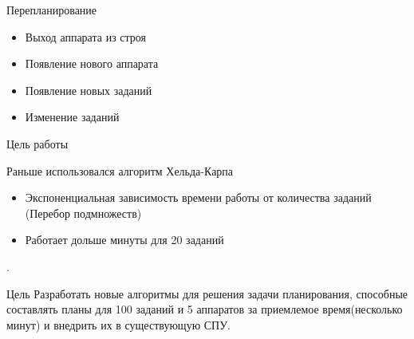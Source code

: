 \documentclass{beamer}
\begin{document}
\begin{frame}{Перепланирование}
\fontsize{14pt}{7.2}\selectfont

\begin{itemize}
\item Выход аппарата из строя
\item Появление нового аппарата
\item Появление новых заданий
\item Изменение заданий
\end{itemize}
\end{frame}

\begin{frame}{Цель работы}

Раньше использовался алгоритм Хельда-Карпа
\begin{itemize}
\item Экспоненциальная зависимость времени работы от количества заданий (Перебор подмножеств)
\item Работает дольше минуты для 20 заданий
\end{itemize}
.
\begin{block}{Цель}
Разработать новые алгоритмы для решения задачи планирования, способные составлять планы для 100 заданий и 5 аппаратов за приемлемое время(несколько минут) и внедрить их в существующую СПУ.
\end{block}

\end{frame}
\end{document}
